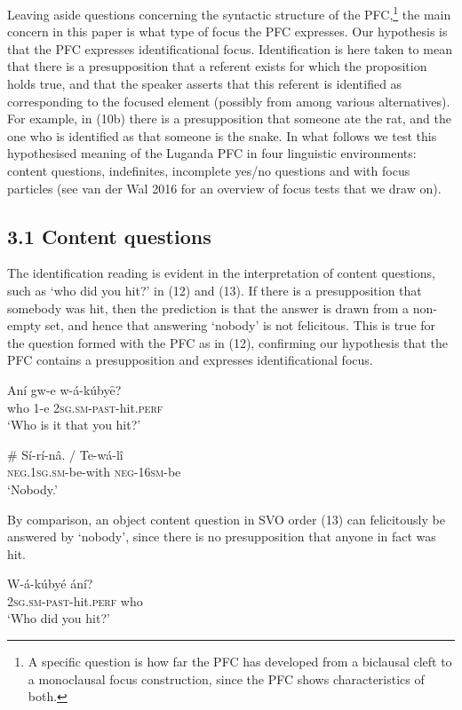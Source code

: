 \documentclass[output=paper]{langsci/langscibook}
\begin{document}
Leaving aside questions concerning the syntactic structure of the PFC,\footnote{ A specific question is how far the PFC has developed from a biclausal cleft to a monoclausal focus construction, since the PFC shows characteristics of both.}{ }the main concern in this paper is what type of focus the PFC expresses. Our hypothesis is that the PFC expresses identificational focus. Identification is here taken to mean that there is a presupposition that a referent exists for which the proposition holds true, and that the speaker asserts that this referent is identified as corresponding to the focused element (possibly from among various alternatives). For example, in (10b) there is a presupposition that someone ate the rat, and the one who is identified as that someone is the snake. In what follows we test this hypothesised meaning of the Luganda PFC in four linguistic environments: content questions, indefinites, incomplete yes/no questions and with focus particles (see van der Wal 2016 for an overview of focus tests that we draw on).

\subsection{3.1 Content questions}

The identification reading is evident in the interpretation of content questions, such as ‘who did you hit?’ in (12) and (13). If there is a presupposition that somebody was hit, then the prediction is that the answer is drawn from a non-empty set, and hence that answering ‘nobody’ is not felicitous. This is true for the question formed with the PFC as in (12), confirming our hypothesis that the PFC contains a presupposition and expresses identificational focus. 

\ea
\gll Aní  gw-e  w-á-kúbyȇ?\\
     who  1-e  \textsc{2sg.sm-past}{}-hit.\textsc{perf}\\
\glt ‘Who is it that you hit?’
\z

\ea
\gll \# Sí-rí-nâ.    /  Te-wá-lî\\
     \textsc{neg.1sg.sm}{}-be-with    \textsc{neg-16sm}{}-be\\
\glt ‘Nobody.’
\z

By comparison, an object content question in SVO order (13) can felicitously be answered by ‘nobody’, since there is no presupposition that anyone in fact was hit.

\ea
\gll W-á-kúbyé    ání?\\
     \textsc{2sg.sm-past}{}-hit.\textsc{perf}  who\\
\glt ‘Who did you hit?’
\z
\end{document}

